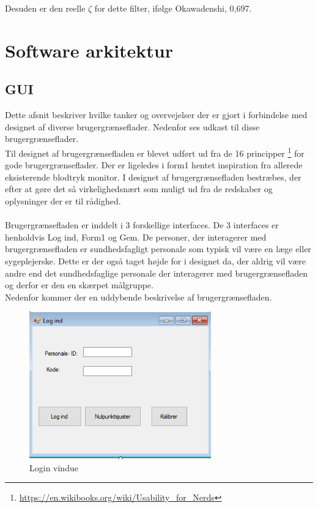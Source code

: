 Desuden er den reelle $\zeta$ for dette filter, ifølge Okawadenshi, 0,697.
\section{Software arkitektur}
\subsection{GUI}
Dette afsnit beskriver hvilke tanker og overvejelser der er gjort i forbindelse med designet af diverse brugergrænseflader. Nedenfor ses udkast til disse brugergrænseflader.\\
Til designet af brugergrænsefladen er blevet udført ud fra de 16 principper \footnote{\url{https://en.wikibooks.org/wiki/Usability_for_Nerds}} for gode brugergrænseflader. Der er ligeledes i form1 hentet inspiration fra allerede eksisterende blodtryk monitor. I designet af brugergrænsefladen bestræbes, der efter at gøre det så virkelighedsnært som muligt ud fra de redskaber og oplysninger der er til rådighed.\\ \\
Brugergrænsefladen er inddelt i 3 forskellige interfaces. De 3 interfaces er henholdvis Log ind, Form1 og Gem. De personer, der interagerer med brugergrænsefladen er sundhedsfagligt personale som typisk vil være en læge eller sygeplejerske. Dette er der også taget højde for i designet da, der aldrig vil være andre end det sundhedsfaglige personale der interagerer med brugergrænsefladen og derfor er den en skærpet målgruppe.\\
Nedenfor kommer der en uddybende beskrivelse af brugergrænsefladen. 

\begin{figure}[H]
	\centering
	\includegraphics[width=0.7\textwidth]{Figurer/GUI/Logind_GUI}
	\caption{Login vindue}
	\label{Login vindue}
\end{figure}

